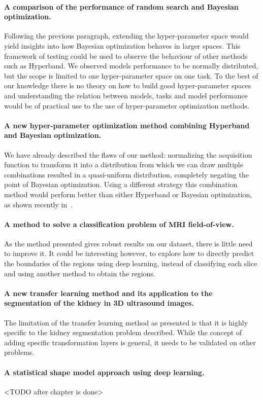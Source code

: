 \paragraph*{A comparison of the performance of random search and Bayesian optimization.} 
Following the previous paragraph, extending the hyper-parameter space would yield insights into how Bayesian optimization behaves in larger spaces. This framework of testing could be used to observe the behaviour of other methods such as Hyperband. We observed models performance to be normally distributed, but the scope is limited to one hyper-parameter space on one task. To the best of our knowledge there is no theory on how to build good hyper-parameter spaces and understanding the relation between models, tasks and model performance would be of practical use to the use of hyper-parameter optimization methods.

\paragraph*{A new hyper-parameter optimization method combining Hyperband and Bayesian optimization.}
We have already described the flaws of our method: normalizing the acquisition function to transform it into a distribution from which we can draw multiple combinations resulted in a quasi-uniform distribution, completely negating the point of Bayesian optimization. Using a different strategy this combination method would perform better than either Hyperband or Bayesian optimization, as shown recently in~\textcite{falkner2018}.

\paragraph*{A method to solve a classification problem of MRI field-of-view.}
As the method presented gives robust results on our dataset, there is little need to improve it. It could be interesting however, to explore how to directly predict the boundaries of the regions using deep learning, instead of classifying each slice and using another method to obtain the regions. 

\paragraph*{A new transfer learning method and its application to the segmentation of the kidney in 3D ultrasound images.}
The limitation of the transfer learning method as presented is that it is highly specific to the kidney segmentation problem described. While the concept of adding specific transformation layers is general, it needs to be validated on other problems. 

\paragraph*{A statistical shape model approach using deep learning.}
<TODO after chapter is done> 
